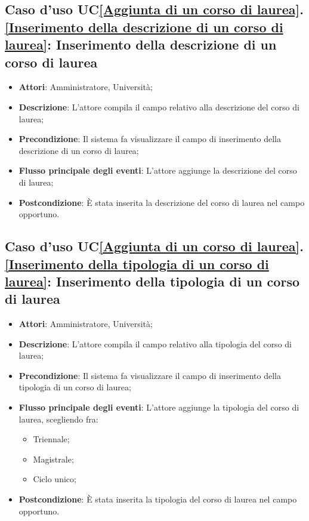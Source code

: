 \subsection{Caso d'uso UC\ref{Aggiunta di un corso di laurea}.\ref{Inserimento della descrizione di un corso di laurea}: Inserimento della descrizione di un corso di laurea}
\begin{itemize}
	\item \textbf{Attori}: Amministratore, Università;
	\item \textbf{Descrizione}: L'attore compila il campo relativo alla descrizione del corso di laurea;
	\item \textbf{Precondizione}: Il sistema fa visualizzare il campo di inserimento della descrizione di un corso di laurea;
	
	\item \textbf{Flusso principale degli eventi}: L'attore aggiunge la descrizione del corso di laurea;
	\item \textbf{Postcondizione}: È stata inserita la descrizione del corso di laurea nel campo opportuno.
\end{itemize}

\subsection{Caso d'uso UC\ref{Aggiunta di un corso di laurea}.\ref{Inserimento della tipologia di un corso di laurea}: Inserimento della tipologia di un corso di laurea}
\begin{itemize}
	\item \textbf{Attori}: Amministratore, Università;
	\item \textbf{Descrizione}: L'attore compila il campo relativo alla tipologia del corso di laurea;
	\item \textbf{Precondizione}: Il sistema fa visualizzare il campo di inserimento della tipologia di un corso di laurea;
	\item \textbf{Flusso principale degli eventi}: L'attore aggiunge la tipologia del corso di laurea, scegliendo fra:
		\begin{itemize}
			\item Triennale;
			\item Magistrale;
			\item Ciclo unico;
		\end{itemize}
	\item \textbf{Postcondizione}: È stata inserita la tipologia del corso di laurea nel campo opportuno.
\end{itemize}

